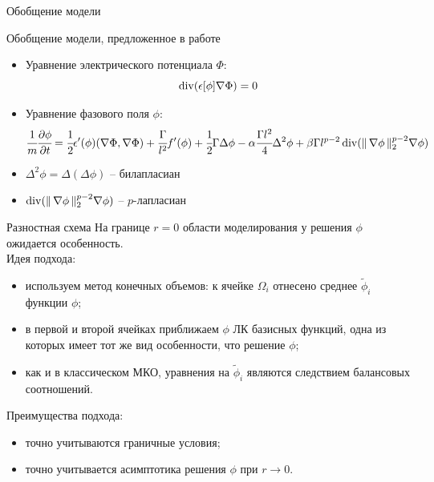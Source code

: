 \begin{frame}{Обобщение модели}
\begin{block}{Обобщение модели, предложенное в работе \cite{zipunova_higher_codimension}}
\begin{itemize}
	\item Уравнение электрического потенциала $\Phi$:
	$$\operatorname{{div}}(\epsilon[\phi] \nabla \Phi) = 0$$
	\item Уравнение фазового поля $\phi$:
	$$\cfrac{1}{m} \cfrac{\partial \phi}{\partial t} =
    \cfrac{1}{2} \epsilon'(\phi) (\nabla \Phi, \nabla \Phi) +
    \cfrac{\Gamma}{l^2} f'(\phi) +
    \cfrac{1}{2} \Gamma \Delta \phi -
    \alpha \cfrac{\Gamma l^2}{4} \Delta^2 \phi +
    \beta \Gamma l^{p - 2} \operatorname{{div}} (\| \, \nabla \phi \, \|_2^{p - 2} \nabla \phi)$$
\end{itemize}
\end{block}
\begin{itemize}
	\item $\Delta^2 \phi = \Delta(\Delta \phi)$ -- билапласиан
	\item $\operatorname{{div}} (\| \, \nabla \phi \, \|_2^{p - 2} \nabla \phi)$ -- $p$-лапласиан
\end{itemize}
\end{frame}


\begin{frame}{Разностная схема}
На границе $r = 0$ области моделирования у решения $\phi$ ожидается особенность. \\
Идея подхода:
\begin{itemize}
	\item используем метод конечных объемов: к ячейке $\Omega_i$ отнесено среднее
	$\widetilde{\phi}_i$ функции $\phi$;
	\item в первой и второй ячейках приближаем $\phi$ ЛК базисных функций, одна из которых имеет
	тот же вид особенности, что решение $\phi$;
	\item как и в классическом МКО, уравнения на $\widetilde{\phi}_i$ являются следствием
	балансовых соотношений.
\end{itemize}
Преимущества подхода:
\begin{itemize}
	\item точно учитываются граничные условия;
	\item точно учитывается асимптотика решения $\phi$ при $r \to 0$.
\end{itemize}
\end{frame}


